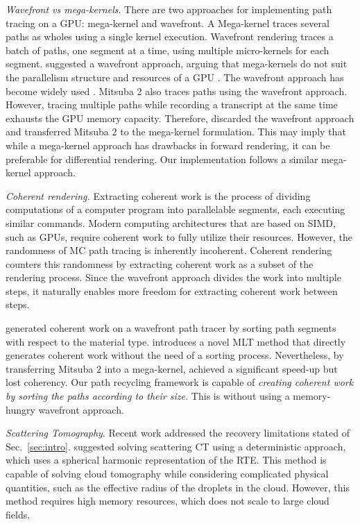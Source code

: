 \documentclass{article}
\begin{document}
{\em Wavefront vs mega-kernels}. There are two approaches for implementing path tracing on a \ac{GPU}: mega-kernel and wavefront. A Mega-kernel traces several paths as wholes using a single kernel execution. Wavefront rendering traces a batch of paths, one segment at a time, using multiple micro-kernels for each segment. \citep{laine2013megakernels} suggested a wavefront approach, arguing that mega-kernels do not suit the parallelism structure and resources of a \ac{GPU} . The wavefront approach has become widely used \citep{lee2017vectorized, fascione2018manuka}. Mitsuba 2 also traces paths using the wavefront approach. However, tracing multiple paths while recording a transcript at the same time exhausts the \ac{GPU} memory capacity. Therefore, \citep{nimier2020radiative} discarded the wavefront approach and transferred Mitsuba 2 to the mega-kernel formulation. This may imply that while a mega-kernel approach has drawbacks in forward rendering, it can be preferable for differential rendering. Our implementation follows a similar mega-kernel approach.

{\em Coherent rendering.} Extracting coherent work is the process of dividing computations of a computer program into parallelable segments, each executing similar commands. Modern computing architectures that are based on \ac{SIMD}, such as \ac{GPU}s, require coherent work to fully utilize their resources. However, the randomness of \ac{MC} path tracing is inherently incoherent. Coherent rendering counters this randomness by extracting coherent work as a subset of the rendering process. Since the wavefront approach divides the work into multiple steps, it naturally enables more freedom for extracting coherent work between steps.

\citep{afra2016local} generated coherent work on a wavefront path tracer by sorting path segments with respect to the material type. \citep{nimier2019mitsuba} introduces a novel \ac{MLT} method that directly generates coherent work without the need of a sorting process. Nevertheless, by transferring Mitsuba 2 into a mega-kernel, \citep{nimier2020radiative} achieved a significant speed-up but lost coherency. 
Our path recycling framework is capable of {\em creating coherent work by sorting the paths according to their size.} This is without using a memory-hungry wavefront approach.

{\em Scattering Tomography}. Recent work addressed the recovery limitations stated of Sec.~\ref{sec:intro}. \citep{levis2015airborne} suggested solving scattering \ac{CT} using a deterministic approach, which uses a spherical harmonic representation of the \ac{RTE}. This method is capable of solving cloud tomography while considering complicated physical quantities, such as the effective radius of the droplets in the cloud. However, this method requires high memory resources, which does not scale to large cloud fields.
\end{document}
